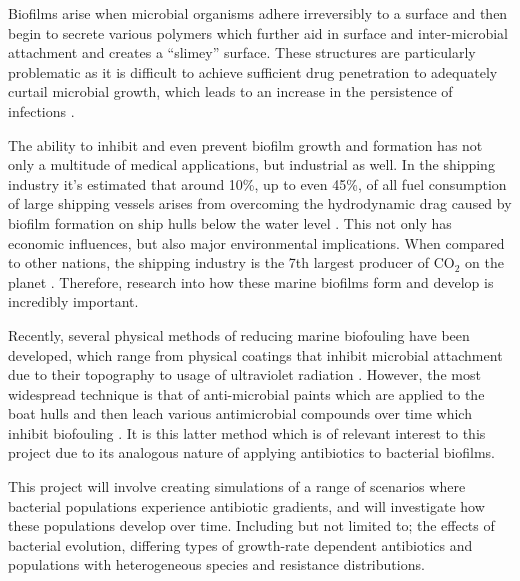 \documentclass[a4paper,12pt]{article}
\begin{document}
Biofilms arise when microbial organisms adhere irreversibly to a surface and then begin to secrete various polymers which further aid
in surface and inter-microbial attachment \cite{bioref:biofilm-formation} and creates a ``slimey'' surface.  These structures are 
particularly problematic as it is difficult to achieve sufficient drug penetration to adequately curtail microbial growth, which leads to an
increase in the persistence of infections \cite{biofilms:Costerton-biofilms-persistent}.

The ability to inhibit and even prevent biofilm growth and formation has not only a multitude of medical applications, but industrial as well.
In the shipping industry it's estimated that around 10\%, up to even 45\%, of all fuel consumption of large shipping vessels arises from overcoming the 
hydrodynamic drag caused by biofilm formation on ship hulls below the water level \cite{bioref:biofilm-fuel-consumption}.  This not only has
economic influences, but also major environmental implications.  When compared to other nations, the shipping industry is the 7th largest 
producer of CO$_2$ on the planet \cite{bioref:shipping-CO2-nation}.  Therefore, research into how these marine biofilms form and develop is 
incredibly important.

Recently, several physical methods of reducing marine biofouling have been developed, which range from physical coatings that inhibit microbial
attachment due to their topography \cite{bioref:non-toxic-antifouling-strat} to usage of ultraviolet radiation \cite{bioref:UV-biofilm-repellent}.
However, the most widespread technique is that of anti-microbial paints which are applied to the boat hulls and then leach various antimicrobial
compounds over time which inhibit biofouling \cite{bioref:antimicro-paint-desc}.  It is this latter method which is of relevant interest to this project
due to its analogous nature of applying antibiotics to bacterial biofilms.

This project will involve creating simulations of a range of scenarios where bacterial populations experience antibiotic gradients, and will
investigate how these populations develop over time.  Including but not limited to; the effects of bacterial evolution, differing types of growth-rate dependent
antibiotics and populations with heterogeneous species and resistance distributions.




% 
\end{document}
